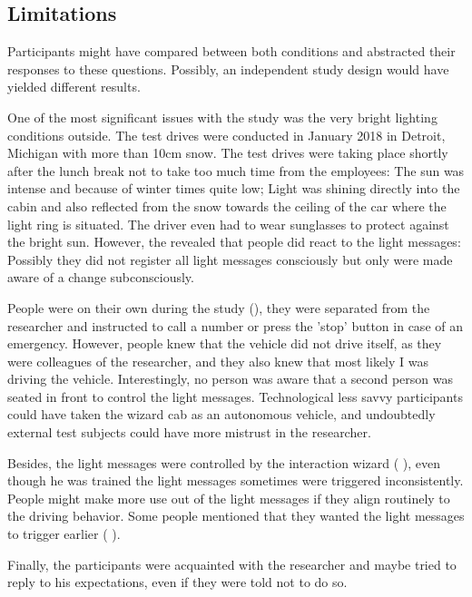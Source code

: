\subsection{Limitations}
\label{sec:limitations}
Participants might have compared between both conditions and abstracted their responses to these questions. Possibly, an independent study design would have yielded different results.

One of the most significant issues with the study was the very bright lighting conditions outside. The test drives were conducted in January 2018 in Detroit, Michigan with more than 10cm snow. The test drives were taking place shortly after the lunch break not to take too much time from the employees: The sun was intense and because of winter times quite low; Light was shining directly into the cabin and also reflected from the snow towards the ceiling of the car where the light ring is situated. The driver even had to wear sunglasses to protect against the bright sun. However, the \emph{} revealed that people did react to the light messages: Possibly they did not register all light messages consciously but only were made aware of a change subconsciously. 

People were on their own during the study (\emph{}), they were separated from the researcher and instructed to call a number or press the 'stop' button in case of an emergency. However, people knew that the vehicle did not drive itself, as they were colleagues of the researcher, and they also knew that most likely I was driving the vehicle. Interestingly, no person was aware that a second person was seated in front to control the light messages. Technological less savvy participants could have taken the wizard cab as an autonomous vehicle, and undoubtedly external test subjects could have more mistrust in the researcher.

Besides, the light messages were controlled by the interaction wizard ( \emph{}), even though he was trained the light messages sometimes were triggered inconsistently. People might make more use out of the light messages if they align routinely to the driving behavior. Some people mentioned that they wanted the light messages to trigger earlier ( \emph{}). 

Finally, the participants were acquainted with the researcher and maybe tried to reply to his expectations, even if they were told not to do so. 

